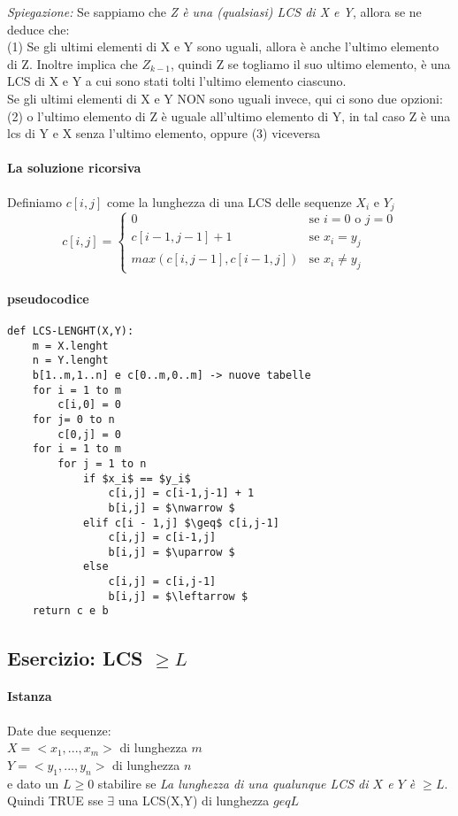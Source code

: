 \documentclass[12pt, a4paper, openany]{book}
\newcommand{\spiegazione}[1]{\begin{box_spiegazione} \small{ \emph{Spiegazione: }#1}\end{box_spiegazione}}
\begin{document}
\spiegazione{
Se sappiamo che \emph{Z è una (qualsiasi) LCS di X e Y}, allora se ne deduce che:
\\(1) Se gli ultimi elementi di X e Y sono uguali, allora è anche l'ultimo elemento di Z. Inoltre implica che $Z_{k-1}$, quindi Z se togliamo il suo ultimo elemento, è una LCS di X e Y a cui sono stati tolti l'ultimo elemento ciascuno.
\\Se gli ultimi elementi di X e Y NON sono uguali invece, qui ci sono due opzioni: (2) o l'ultimo elemento di Z è uguale all'ultimo elemento di Y, in tal caso Z è una lcs di Y e X senza l'ultimo elemento, oppure (3) viceversa 
}
\paragraph{La soluzione ricorsiva}
Definiamo $c[i,j]$ come la lunghezza di una LCS delle sequenze $X_i$ e $Y_j$
\begin{equation*}
	c[i,j] = \begin{cases}
		0 & \text{se $i = 0$ o $j = 0$}\\
		c[i-1,j-1] + 1 & \text{se $x_i = y_j$}\\
		max(c[i,j-1], c[i-1,j]) & \text{se $x_i \neq y_j$}

	\end{cases}
\end{equation*}

\paragraph{pseudocodice}
\begin{lstlisting}
def LCS-LENGHT(X,Y):
	m = X.lenght
	n = Y.lenght
	b[1..m,1..n] e c[0..m,0..m] -> nuove tabelle
	for i = 1 to m
		c[i,0] = 0
	for j= 0 to n
		c[0,j] = 0
	for i = 1 to m
		for j = 1 to n
			if $x_i$ == $y_i$
				c[i,j] = c[i-1,j-1] + 1  
				b[i,j] = $\nwarrow $
			elif c[i - 1,j] $\geq$ c[i,j-1]
				c[i,j] = c[i-1,j]  
				b[i,j] = $\uparrow $
			else
				c[i,j] = c[i,j-1]  
				b[i,j] = $\leftarrow $
	return c e b
\end{lstlisting}



\subsection*{Esercizio: LCS $\geq L$}

\paragraph*{Istanza} Date due sequenze:\\
$X = <x_1,...,x_m>$ di lunghezza $m$\\
$Y = <y_1,...,y_n>$ di lunghezza $n$\\
e dato un $L \geq 0$ stabilire se \emph{La lunghezza di una qualunque LCS di $X$ e $Y$ è $\geq L$}. 
\\Quindi TRUE sse $\exists$ una LCS(X,Y) di lunghezza $geq L$
\end{document}
